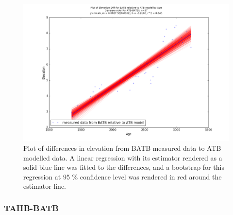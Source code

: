\begin{figure}[H]
	\includegraphics[width=1.7\linewidth, angle=270 ]{data/bothNonZero/withinSeventyFivePercent/gias/theGIA_BATB_relative_to_ATB.png}
	\caption{Plot of differences in elevation from BATB measured data to ATB modelled data. A linear regression with its estimator rendered as
	 a solid blue line was fitted to the differences, and a bootstrap for this regression at 95 \% confidence level was rendered in red
	 around the estimator line.}
	\label{fig:gias_BATBxATB}
\end{figure}
\newpage













\subsubsection{TAHB-BATB}


